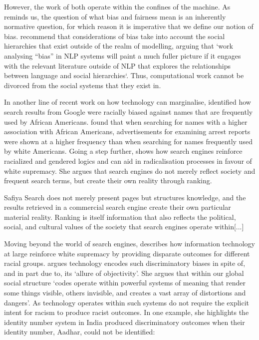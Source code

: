 However, the work of \citet{Kearns:2018,Foulds:2019} both operate within the confines of the machine. As \citet{Blodgett:2020} reminds us, the question of what bias and fairness mean is an inherently normative question, for which reason it is imperative that we define our notion of bias.
\citet{Blodgett:2020} recommend that considerations of bias take into account the social hierarchies that exist outside of the realm of modelling, arguing that `work analysing ``bias'' in NLP systems will paint a much fuller picture if it engages with the relevant literature outside of NLP that explores the relationships between language and social hierarchies`.
Thus, computational work cannot be divorced from the social systems that they exist in.

In another line of recent work on how technology can marginalise, \citet{Sweeney:2013} identified how search results from Google were racially biased against names that are frequently used by African Americans.
\citet{Sweeney:2013} found that when searching for names with a higher association with African Americans, advertisements for examining arrest reports were shown at a higher frequency than when searching for names frequently used by white Americans.
Going a step further, \citet{Noble:2018} shows how search engines reinforce racialized and gendered logics and can aid in radicalisation processes in favour of white supremacy.
She argues that search engines do not merely reflect society and frequent search terms, but create their own reality through ranking.

\begin{citequote}{Safiya \citet[p.148]{Noble:2018}}
  Search does not merely present pages but structures knowledge, and the results retrieved in a commercial search engine create their own particular material reality. Ranking is itself information that also reflects the political, social, and cultural values of the society that search engines operate within[...]
\end{citequote}

Moving beyond the world of search engines, \citet{Benjamin:2019} describes how information technology at large reinforce white supremacy by providing disparate outcomes for different racial groups.
\citet{Benjamin:2019} argues technology encodes such discriminatory biases in spite of, and in part due to, its `allure of objectivity'.
She argues that within our global social structure `codes operate within powerful systems of meaning that render some things visible, others invisible, and creates a vast array of distortions and dangers'.
As technology operates within such systems do not require the explicit intent for racism to produce racist outcomes.
In one example, she highlights the identity number system in India produced discriminatory outcomes when their identity number, Aadhar, could not be identified:


